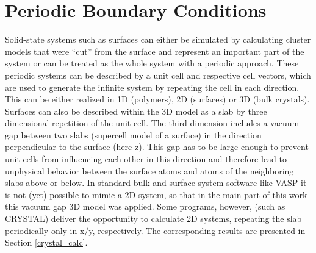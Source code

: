 \documentclass[11pt,DIV=13,BCOR=5mm,a4paper,headinclude]{scrbook}
\begin{document}
\section{Periodic Boundary Conditions}
Solid-state systems such as surfaces can either be simulated by calculating cluster models that were ``cut'' from the surface and represent an important part of the system or can be treated as the whole system with a periodic approach.
These periodic systems can be described by a unit cell and respective cell vectors, which are used to generate the infinite system by repeating the cell in each direction.
This can be either realized in 1D (polymers), 2D (surfaces) or 3D (bulk crystals).
Surfaces can also be described within the 3D model as a slab by three dimensional repetition of the unit cell.
The third dimension includes a vacuum gap between two slabs (supercell model of a surface) in the direction perpendicular to the surface (here z).
This gap has to be large enough to prevent unit cells from influencing each other in this direction and therefore lead to unphysical behavior between the surface atoms and atoms of the neighboring slabs above or below.
In standard bulk and surface system software like VASP\cite{kresse1993,kresse2,kresse3,kresse4,kresse99} it is not (yet) possible to mimic a 2D system, so that in the main part of this work this vacuum gap 3D model was applied.
Some programs, however, (such as CRYSTAL\cite{crystal14}) %
deliver the opportunity to calculate 2D systems, repeating the slab periodically only in x/y, respectively.
The corresponding results are presented in Section \ref{crystal_calc}.


\end{document}
